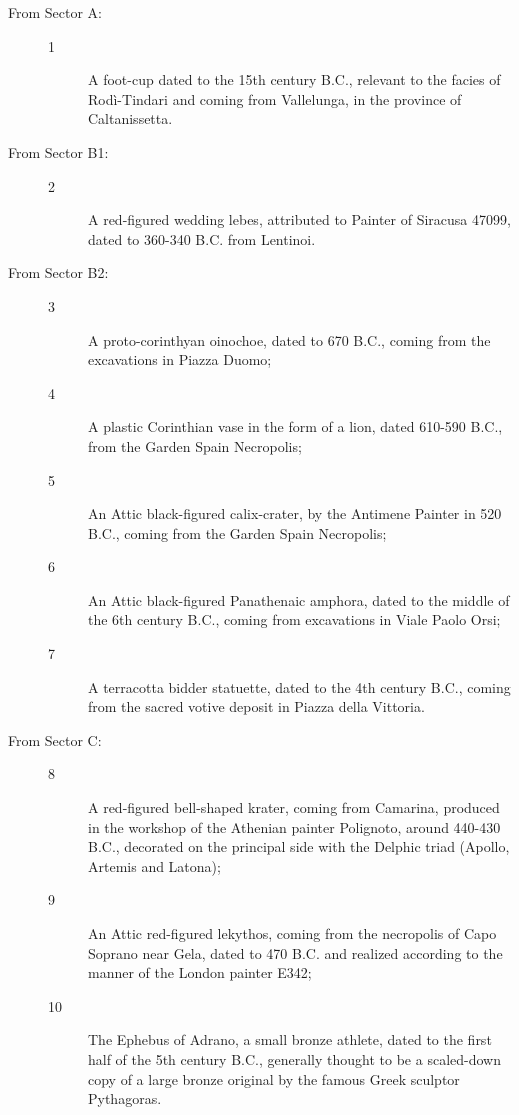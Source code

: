 \documentclass[amsthm,ebook]{saparticle}
\begin{document}
\begin{description}
\item[From Sector A:] 

\begin{description}
\item[1] A foot-cup dated to the 15th century B.C., relevant to the facies of Rodì-Tindari and coming from Vallelunga, in the province of Caltanissetta. 
\end{description}


\item[From Sector B1:] 

\begin{description}
\item[2] A red-figured wedding lebes, attributed to Painter of Siracusa 47099, dated to 360-340 B.C. from Lentinoi. 
\end{description}


\item[From Sector B2:] 

\begin{description}
\item[3] A proto-corinthyan oinochoe, dated to 670 B.C., coming from the excavations in Piazza Duomo; 
\item[4] A plastic Corinthian vase in the form of a lion, dated 610-590 B.C., from the Garden Spain Necropolis; 
\item[5] An Attic black-figured calix-crater, by the Antimene Painter in 520 B.C., coming from the Garden Spain Necropolis; 
\item[6] An Attic black-figured Panathenaic amphora, dated to the middle of the 6th century B.C., coming from excavations in Viale Paolo Orsi; 
\item[7] A terracotta bidder statuette, dated to the 4th century B.C., coming from the sacred votive deposit in Piazza della Vittoria. 
\end{description}

\item[From Sector C:]

\begin{description}
\item[8] A red-figured bell-shaped krater, coming from Camarina, produced in the workshop of the Athenian painter Polignoto, around 440-430 B.C., decorated on the principal side with the Delphic triad (Apollo, Artemis and Latona); 
\item[9] An Attic red-figured lekythos, coming from the necropolis of Capo Soprano near Gela, dated to 470 B.C. and realized according to the manner of the London painter E342; 
\item[10] The Ephebus of Adrano, a small bronze athlete, dated to the first half of the 5th century B.C., generally thought to be a scaled-down copy of a large bronze original by the famous Greek sculptor Pythagoras. 
\end{description}



\end{description}
\end{document}
